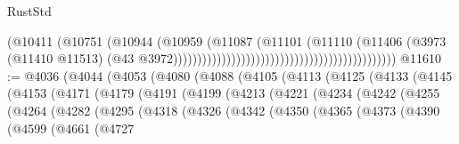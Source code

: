 \begin{lexlean}{RustStd}
\begin{coremodule}
                                                                            (@10411
                                                                              (@10751
                                                                                (@10944
                                                                                  (@10959
                                                                                    (@11087
                                                                                      (@11101
                                                                                        (@11110
                                                                                          (@11406
                                                                                            (@3973
                                                                                              (@11410
                                                                                                @11513)
                                                                                              (@43
                                                                                                @3972))))))))))))))))))))))))))))))))))))))))))))))
@11610 := @4036
    (@4044
      (@4053
        (@4080
          (@4088
            (@4105
              (@4113
                (@4125
                  (@4133
                    (@4145
                      (@4153
                        (@4171
                          (@4179
                            (@4191
                              (@4199
                                (@4213
                                  (@4221
                                    (@4234
                                      (@4242
                                        (@4255
                                          (@4264
                                            (@4282
                                              (@4295
                                                (@4318
                                                  (@4326
                                                    (@4342
                                                      (@4350
                                                        (@4365
                                                          (@4373
                                                            (@4390
                                                              (@4599
                                                                (@4661
                                                                  (@4727

\end{coremodule}
\end{lexlean}
